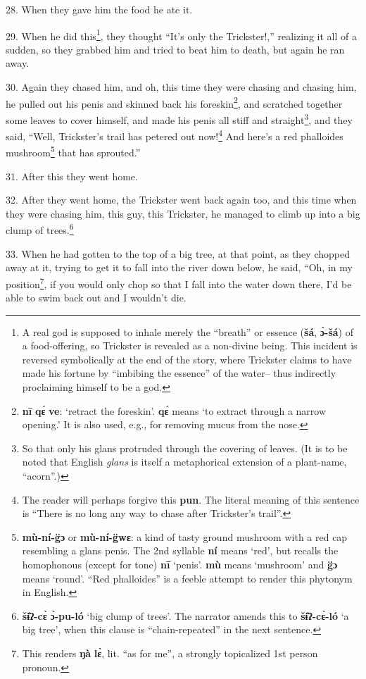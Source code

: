 28. When they gave him the food he ate it.

29. When he did this\footnote{A real god is supposed to inhale merely the ``breath'' or essence (\textbf{šá}, \textbf{ɔ̀-šá}) of a food-offering, so Trickster is revealed as a non-divine being. This incident is reversed symbolically at the end of the story, where Trickster claims to have made his fortune by ``imbibing the essence'' of the water-- thus indirectly proclaiming himself to be a god.}, they thought ``It's only the Trickster!,'' realizing
it all of a sudden, so they grabbed him and tried to beat him to death, but again
he ran away.

30. Again they chased him, and oh, this time they were chasing and chasing him,
he pulled out his penis and skinned back his foreskin\footnote{\textbf{nī} \textbf{qɛ́} \textbf{ve}: `retract the foreskin'. \textbf{qɛ́} means `to extract through a narrow opening.' It is also used, e.g., for removing mucus from the nose.}, and scratched together
some leaves to cover himself, and made his penis all stiff and straight\footnote{So that only his glans protruded through the covering of leaves. (It is to be noted that English \textit{glans} is itself a metaphorical extension of a plant-name, ``acorn''.)}, and
they said, ``Well, Trickster's trail has petered out now!\footnote{The reader will perhaps forgive this \textbf{pun}. The literal meaning of this sentence is ``There is no long any way to chase after Trickster's trail''.} And here's a red
phalloides mushroom\footnote{\textbf{mù-ní-g̈ɔ} or \textbf{mù-ní-g̈wɛ}: a kind of tasty ground mushroom with a red cap resembling a glans penis. The 2nd syllable \textbf{ní} means `red', but recalls the homophonous (except for tone) \textbf{nī} `penis'. \textbf{mù} means `mushroom' and \textbf{g̈ɔ} means `round'. ``Red phalloides'' is a feeble attempt to render this phytonym in English.} that has sprouted.''

31. After this they went home.

32. After they went home, the Trickster went back again too, and this time when
they were chasing him, this guy, this Trickster, he managed to climb up into a
big clump of trees.\footnote{\textbf{šɨ̂ʔ-cɛ̀} \textbf{ɔ̀-pu-ló} `big clump of trees'. The narrator amends this to \textbf{šɨ̂ʔ-cɛ̀-ló} `a big tree', when this clause is ``chain-repeated'' in the next sentence.}

33. When he had gotten to the top of a big tree, at that point, as they chopped
away at it, trying to get it to fall into the river down below, he said, ``Oh,
in my position\footnote{This renders \textbf{ŋà} \textbf{lɛ̀}, lit. ``as for me'', a strongly topicalized 1st person pronoun.}, if you would only chop so that I fall into the water down
there, I'd be able to swim back out and I wouldn't die.

